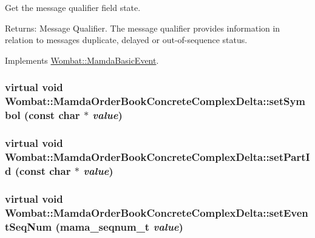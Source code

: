 Get the message qualifier field state. 

\begin{Desc}
\item[Returns:]Message Qualifier. The message qualifier provides information in relation to messages duplicate, delayed or out-of-sequence status. \end{Desc}


Implements \hyperlink{classWombat_1_1MamdaBasicEvent_3454d51e1131d9949691ee4b4153cd97}{Wombat::Mamda\-Basic\-Event}.\hypertarget{classWombat_1_1MamdaOrderBookConcreteComplexDelta_67f7ae620def8dd8058864e56cbd482f}{
\subsubsection[setSymbol]{\setlength{\rightskip}{0pt plus 5cm}virtual void Wombat::Mamda\-Order\-Book\-Concrete\-Complex\-Delta::set\-Symbol (const char $\ast$ {\em value})}}
\label{classWombat_1_1MamdaOrderBookConcreteComplexDelta_67f7ae620def8dd8058864e56cbd482f}


\hypertarget{classWombat_1_1MamdaOrderBookConcreteComplexDelta_1b28a5e4cf6393f62310d1c959714fbf}{
\subsubsection[setPartId]{\setlength{\rightskip}{0pt plus 5cm}virtual void Wombat::Mamda\-Order\-Book\-Concrete\-Complex\-Delta::set\-Part\-Id (const char $\ast$ {\em value})}}
\label{classWombat_1_1MamdaOrderBookConcreteComplexDelta_1b28a5e4cf6393f62310d1c959714fbf}


\hypertarget{classWombat_1_1MamdaOrderBookConcreteComplexDelta_248b8d7917f74a358068a9fd6b643ae3}{
\subsubsection[setEventSeqNum]{\setlength{\rightskip}{0pt plus 5cm}virtual void Wombat::Mamda\-Order\-Book\-Concrete\-Complex\-Delta::set\-Event\-Seq\-Num (mama\_\-seqnum\_\-t {\em value})}}
\label{classWombat_1_1MamdaOrderBookConcreteComplexDelta_248b8d7917f74a358068a9fd6b643ae3}


